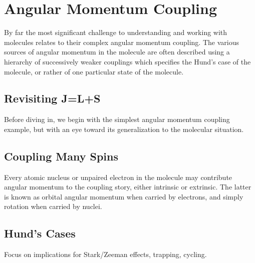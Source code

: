 \section{Angular Momentum Coupling}

By far the most significant challenge to understanding and working with molecules relates to their complex angular momentum coupling. 
The various sources of angular momentum in the molecule are often described using a hierarchy of successively weaker couplings which specifies the Hund's case of the molecule, or rather of one particular state of the molecule.


\subsection{Revisiting J=L+S}

Before diving in, we begin with the simplest angular momentum coupling example, but with an eye toward its generalization to the molecular situation.

\subsection{Coupling Many Spins}

Every atomic nucleus or unpaired electron in the molecule may contribute angular momentum to the coupling story, either intrinsic or extrinsic.
The latter is known as orbital angular momentum when carried by electrons, and simply rotation when carried by nuclei.

\subsection{Hund's Cases}

Focus on implications for Stark/Zeeman effects, trapping, cycling.




\ifx\justbeingincluded\undefined

\fi

